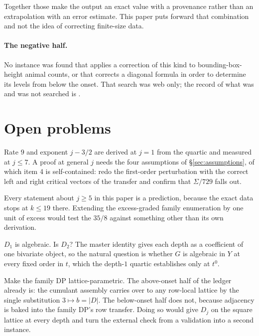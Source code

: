 \documentclass[11pt]{article}
\newcommand{\Dj}{D_j}
\begin{document}
Together those make the output an exact value with a provenance rather than an
extrapolation with an error estimate. This paper puts forward that combination
and not the idea of correcting finite-size data.

\paragraph{The negative half.} No instance was found that applies a correction
of this kind to bounding-box-height animal counts, or that corrects a diagonal
formula in order to determine its levels from below the onset. That search was web only;
the record of what was and was not searched is
.

\section{Open problems}
\label{sec:open}

\begin{openproblem}
Rate $9$ and exponent $j - 3/2$ are derived at $j = 1$ from the quartic and
measured at $j \le 7$. A proof at general $j$ needs the four assumptions of
\S\ref{sec:assumptions}, of which item 4 is self-contained: redo the first-order
perturbation with the correct left and right critical vectors of the transfer and
confirm that $\Sigma/729$ falls out.
\end{openproblem}

\begin{openproblem}[an exact $D_5$]
Every statement about $j \ge 5$ in this paper is a prediction, because the exact
data stops at $k \le 19$ there. Extending the excess-graded family enumeration by
one unit of excess would test the $35/8$ against something other than its own
derivation.
\end{openproblem}

\begin{openproblem}
$D_1$ is algebraic. Is $D_2$? The master identity gives each depth as a
coefficient of one bivariate object, so the natural question is whether $G$ is
algebraic in $Y$ at every fixed order in $t$, which the depth-$1$ quartic
establishes only at $t^0$.
\end{openproblem}

\begin{openproblem}
Make the family DP lattice-parametric. The above-onset half of the ledger
already is: the cumulant assembly carries over to any row-local lattice by the
single substitution $3 \mapsto b = |D|$. The below-onset half does not, because
adjacency is baked into the family DP's row transfer. Doing so would give
$\Dj$ on the square lattice at every depth and turn the external check from a
validation into a second instance.
\end{openproblem}
\end{document}
